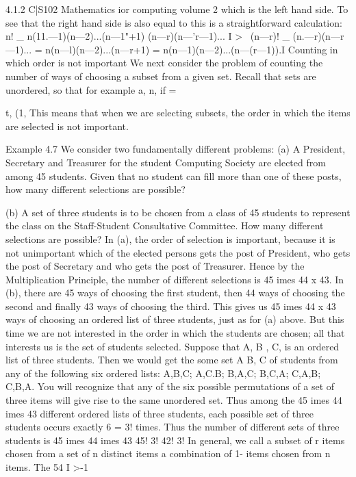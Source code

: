\documentclass{beamer}
\begin{document}
4.1.2
C|S102 Mathematics ior computing volume 2
which is the left hand side. To see that the right hand side is also
equal to this is a straightforward calculation:
n! _ n(11.—1)(n—2)...(n—1"+1) (n—r)(n—'r—1)...
I
>~
(n—r)! _ (n.—r)(n—r—1)...
= n(n—l)(n—2)...(n—r+1)
= n(n—1)(n—2)...(n—(r—1)).I
Counting in which order is not important
We next consider the problem of counting the number of ways of
choosing a subset from a given set. Recall that sets are unordered,
so that for example
{a, n, if} = {t, (1, 
This means that when we are selecting subsets, the order in which
the items are selected is not important.

Example 4.7 We consider two fundamentally different problems:
(a) A President, Secretary and Treasurer for the student Computing
Society are elected from among 45 students. Given that no
student can ﬁll more than one of these posts, how many
different selections are possible?

(b) A set of three students is to be chosen from a class of 45
students to represent the class on the Staff-Student Consultative
Committee. How many different selections are possible?
In (a), the order of selection is important, because it is not
unimportant which of the elected persons gets the post of President,
who gets the post of Secretary and who gets the post of Treasurer.
Hence by the Multiplication Principle, the number of different
selections is 45 	imes 44 x 43.
In (b), there are 45 ways of choosing the ﬁrst student, then 44 ways
of choosing the second and ﬁnally 43 ways of choosing the third.
This gives us 45 	imes 44 x 43 ways of choosing an ordered list of three
students, just as for (a) above. But this time we are not interested in
the order in which the students are chosen; all that interests us is
the set of students selected. Suppose that A, B , C, is an ordered list
of three students. Then we would get the some set {A B, C} of
students from any of the following six ordered lists:
A,B,C; A,C.B; B,A,C; B,C,A; C,A,B; C,B,A.
You will recognize that any of the six possible permutations of a set
of three items will give rise to the same unordered set. Thus among
the 45 	imes 44 	imes 43 different ordered lists of three students, each
possible set of three students occurs exactly 6 = 3! times. Thus the
number of different sets of three students is
45 	imes 44 	imes 43 45!
3! 42! 3!
In general, we call a subset of r items chosen from a set of n distinct
items a combination of 1- items chosen from n items. The
54
I\)
>-1



}
\end{document}
